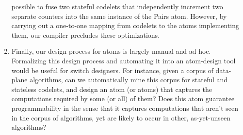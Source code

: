 \begin{enumerate}
possible to fuse two stateful codelets that independently increment two
separate counters into the same instance of the Pairs atom. However, by
carrying out a one-to-one mapping from codelets to the atoms implementing them,
our compiler precludes these optimizations. 
\item Finally, our design process for atoms is largely manual and ad-hoc.
Formalizing this design process and automating it into an atom-design tool
would be useful for switch designers. For instance, given a corpus of
data-plane algorithms, can we automatically mine this corpus for stateful and
stateless codelets, and design an atom (or atoms) that captures the
computations required by some (or all) of them?  Does this atom guarantee
programmability in the sense that it captures computations that aren't seen in
the corpus of algorithms, yet are likely to occur in other, as-yet-unseen
algorithms?
\end{enumerate}
